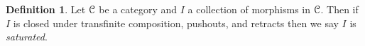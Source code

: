 \documentclass{amsart}
\theoremstyle{plain}
\newtheorem{proposition}[theorem]{Proposition}
\theoremstyle{definition}
\newtheorem{definition}[theorem]{Definition}
\DeclareMathOperator{\Ch}{Ch}
\newcommand{\0}{\mathbf{0}}
\newcommand{\cC}{\mathcal C}
\newcommand{\bZ}{\mathbb{Z}}
\renewcommand{\(}{\left(}
\renewcommand{\)}{\right)}
\def\scr{\EuScript}
\def\cC{\scr{C}}
\newcommand{\Cof}{\mathcal C\mathrm{of}}
\newcommand{\Fib}{\mathcal F\mathrm{ib}}
\newcommand{\W}{\mathcal W}
\newcommand{\inj}{\text-\mathrm{inj}}
\newcommand{\cof}{\text-\mathrm{cof}}
\DeclareMathOperator*{\colim}{colim}
\begin{document}
\begin{definition}\label{saturated}
  Let $\cC$ be a category and $I$ a collection of morphisms in $\cC$. Then if $I$ is closed under transfinite composition, pushouts, and retracts then we say $I$ is \textit{saturated}.
\end{definition}


%
%
%
\end{document}
